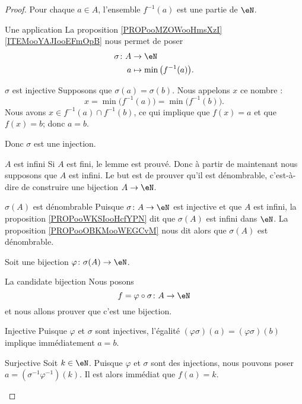 \begin{proof}
    Pour chaque \( a\in A\), l'ensemble \( f^{-1}(a)\) est une partie de \( \eN\). 
    \begin{subproof}
        \item[Une application]
            La proposition \ref{PROPooMZOWooHmsXzI}\ref{ITEMooYAJIooEFmOpB} nous permet de poser
            \begin{equation}
                \begin{aligned}
                    \sigma\colon A&\to \eN \\
                    a&\mapsto \min\big( f^{-1}(a) \big). 
                \end{aligned}
            \end{equation}
        \item[\( \sigma\) est injective]
            Supposons que \( \sigma(a)=\sigma(b)\). Nous appelons \( x\) ce nombre :
            \begin{equation}
                x=\min\big( f^{-1}(a) \big)=\min\big( f^{-1}(b) \big).
            \end{equation}
            Nous avons \( x\in f^{-1}(a)\cap f^{-1}(b)\), ce qui implique que \( f(x)=a\) et que \( f(x)=b\); donc \( a=b\).

            Donc \( \sigma\) est une injection.
        \item[\( A\) est infini]
            Si \( A\) est fini, le lemme est prouvé. Donc à partir de maintenant nous supposons que \( A\) est infini. Le but est de prouver qu'il est dénombrable, c'est-à-dire de construire une bijection \( A\to \eN\).
        \item[\( \sigma(A)\) est dénombrable]
            Puisque \( \sigma\colon A\to  \eN\) est injective et que \( A\) est infini, la proposition \ref{PROPooWKSIooHcfYPN} dit que \( \sigma(A)\) est infini dans \( \eN\). La proposition \ref{PROPooOBKMooWEGCvM} nous dit alors que \( \sigma(A)\) est dénombrable.

            Soit une bijection \( \varphi\colon \sigma(A)\to \eN\).
        \item[La candidate bijection]
            Nous posons
            \begin{equation}
                f=\varphi\circ \sigma\colon A\to \eN
            \end{equation}
            et nous allons prouver que c'est une bijection.
        \item[Injective]
            Puisque \( \varphi\) et \( \sigma\) sont injectives, l'égalité \( (\varphi\sigma)(a)=(\varphi\sigma)(b)\) implique immédiatement \( a=b\).
        \item[Surjective]
            Soit \( k\in \eN\). Puisque \( \varphi\) et \( \sigma\) sont des injections, nous pouvons poser \( a=(\sigma^{-1}\varphi^{-1})(k)\). Il est alors immédiat que \( f(a)=k\).
    \end{subproof}
\end{proof}

